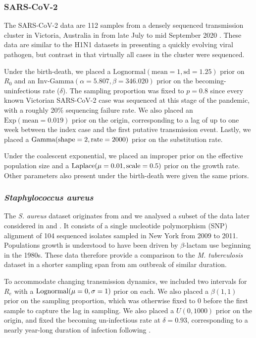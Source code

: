\documentclass[11pt]{article}
\begin{document}
\begin{spacing}{1.5}
\subsubsection*{SARS-CoV-2}
The SARS-CoV-2 data are 112 samples from a densely sequenced transmission cluster in Victoria, Australia in from late July to mid September 2020 \citet{lane2021genomics}. These data are similar to the H1N1 datasets in presenting a quickly evolving viral pathogen, but contrast in that virtually all cases in the cluster were sequenced.

Under the birth-death, we placed a $\textrm{Lognormal}(\textrm{mean}=1, \textrm{sd}=1.25)$ prior on $R_0$ and an $\textrm{Inv-Gamma}(\alpha=5.807, \beta=346.020)$ prior on the becoming-uninfectious rate ($\delta$).  The sampling proportion was fixed to $p=0.8$ since every known Victorian SARS-CoV-2 case was sequenced at this stage of the pandemic, with a roughly 20\% sequencing failure rate. We also placed an $\textrm{Exp}(\textrm{mean}=0.019)$ prior on the origin, corresponding to a lag of up to one week  between the index case and the first putative transmission event. Lastly, we placed a $\textnormal{Gamma}(\textnormal{shape}=2,\textnormal{rate}=2000)$ prior on the substitution rate.

Under the coalescent exponential, we placed an improper prior on the effective population size and a $\textnormal{Laplace}(\mu=0.01,\textnormal{scale}=0.5)$ prior on the growth rate. Other parameters also present under the birth-death were given the same priors.


\subsubsection*{\textit{Staphylococcus aureus}}
The \textit{S. aureus} dataset originates from \citet{uhlemann_molecular_2014} and we analysed a subset of the data later considered in \citet{duchene_2016_genome} and \citet{volz_modeling_2018}. It consists of a single nucleotide polymorphism (SNP) alignment of 104 sequenced isolates sampled in New York from 2009 to 2011. Populations growth is understood to have been driven by $\beta$-lactam use beginning in the 1980s. These data therefore provide a comparison to the \textit{M. tuberculosis} dataset in a shorter sampling span from am outbreak of similar duration.

To accommodate changing transmission dynamics, we included two intervals for $R_e$ with a $\textnormal{Lognormal}(\mu=0,\sigma=1)$ prior on each. We also placed a $\beta(1,1)$ prior on the sampling proportion, which was otherwise fixed to 0 before the first sample to capture the lag in sampling. We also placed a $U(0,1000)$ prior on the origin, and fixed the becoming un-infectious rate at $\delta=0.93$, corresponding to a nearly year-long duration of infection following \citet{volz_modeling_2018}.


\end{spacing}
\end{document}
